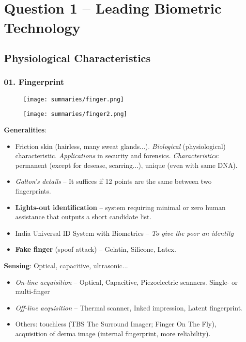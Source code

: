 \documentclass[a4paper]{article}
\title{\vspace{-.25cm} \HWTitle \\ \vspace{.25cm}}
\author{\HWAuthorName}
\begin{document}
\maketitle

\section*{Question 1 -- Leading Biometric Technology} %
\label{sec:question_1}
  \subsection*{Physiological Characteristics}
    \subsubsection*{01. Fingerprint}
      \begin{figure}[htp]
        \centering
          \texttt{[image: summaries/finger.png]}
      \end{figure}
      \begin{figure}[htp]
        \centering
          \texttt{[image: summaries/finger2.png]}
      \end{figure}
      \newpage
      \textbf{Generalities}:
      \begin{itemize}
        \item Friction skin (hairless, many sweat glands...). \emph{Biological} (physiological) characteristic. \emph{Applications} in security and forensics. \emph{Characteristics}: permanent (except for desease, scarring...), unique (even with same DNA).
        \item \emph{Galton's details} -- It suffices if 12 points are the same between two fingerprints.
        \item \textbf{Lights-out identification} -- system requiring minimal or zero human assistance that outputs a short candidate list.
        \item India Universal ID System with Biometrics -- \emph{To give the poor an identity}
        \item \textbf{Fake finger} (spoof attack) -- Gelatin, Silicone, Latex.
      \end{itemize}

      \textbf{Sensing}: Optical, capacitive, ultrasonic...
      \begin{itemize}
        \item \emph{On-line acquisition} -- Optical, Capacitive, Piezoelectric scanners. Single- or multi-finger
        \item \emph{Off-line acquisition} -- Thermal scanner, Inked impression, Latent fingerprint.
        \item Others: touchless (TBS The Surround Imager; Finger On The Fly), acquisition of derma image (internal fingerprint, more reliability).
      \end{itemize}
\end{document}
